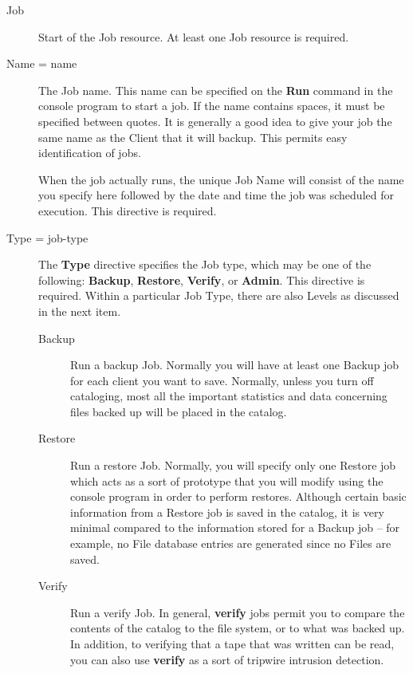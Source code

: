 \begin{description}

\item [Job]
   Start of the Job resource. At least one Job  resource is required. 

\item [Name = \lt{}name\gt{}]
   The Job name. This name can be specified  on the {\bf Run} command in the
   console program to start a job. If the  name contains spaces, it must be
   specified between quotes. It is  generally a good idea to give your job the
   same name as the Client  that it will backup. This permits easy identification
   of jobs.  

   When the job actually runs, the unique Job Name will consist  of the name you
   specify here followed by the date and time the  job was scheduled for
   execution. This directive is required. 

\item [Type = \lt{}job-type\gt{}]
   The {\bf Type} directive specifies  the Job type, which may be one of the
following: {\bf Backup},  {\bf Restore}, {\bf Verify}, or {\bf Admin}. This
directive  is required. Within a particular Job Type, there are also Levels 
as discussed in the next item.  

\begin{description}

\item [Backup]
   Run a backup Job. Normally you will  have at least one Backup job for each
client you want  to save. Normally, unless you turn off cataloging,  most all
the important statistics and data concerning  files backed up will be placed
in the catalog. 

\item [Restore]
   Run a restore Job. Normally, you will  specify only one Restore job which acts
as a sort  of prototype that you will modify using the console  program in
order to perform restores. Although certain  basic information from a Restore
job is saved in the  catalog, it is very minimal compared to the information 
stored for a Backup job -- for example, no File database  entries are
generated since no Files are saved.  

\item [Verify]
   Run a verify Job. In general, {\bf verify}  jobs permit you to compare the
contents of the catalog  to the file system, or to what was backed up. In
addition,  to verifying that a tape that was written can be read,  you can
also use {\bf verify} as a sort of tripwire  intrusion detection.  


\end{description}
\end{description}
